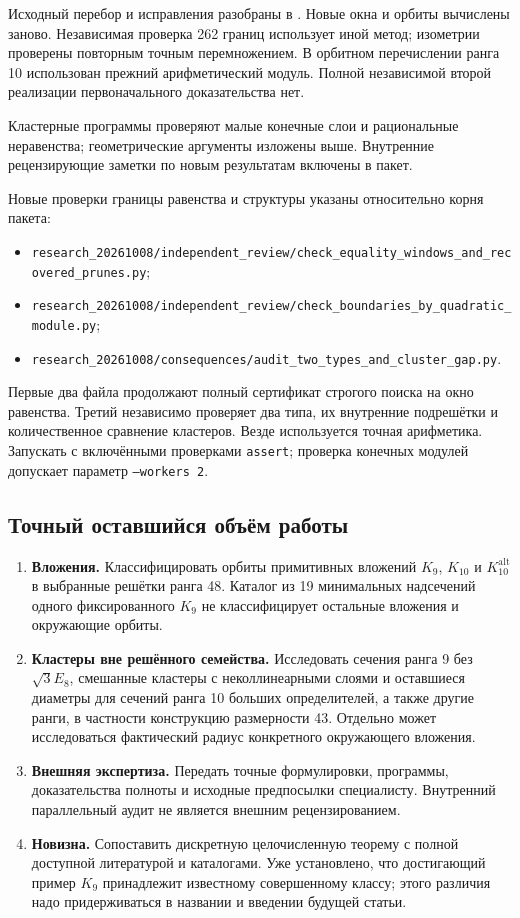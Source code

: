 \documentclass[11pt,a4paper]{article}
\theoremstyle{remark}\newtheorem{remark}[theorem]{Замечание}
\newcommand{\Kalt}{K_{10}^{\mathrm{alt}}}
\newcommand{\file}[1]{{\small\nolinkurl{#1}}}
\begin{document}
Исходный перебор и исправления разобраны в \cite{audit}. Новые окна и орбиты вычислены заново. Независимая проверка 262 границ использует иной метод; изометрии проверены повторным точным перемножением. В орбитном перечислении ранга 10 использован прежний арифметический модуль. Полной независимой второй реализации первоначального доказательства нет.

Кластерные программы проверяют малые конечные слои и рациональные неравенства; геометрические аргументы изложены выше. Внутренние рецензирующие заметки по новым результатам включены в пакет.

Новые проверки границы равенства и структуры указаны относительно корня пакета:
\begin{itemize}
\item \file{research_20261008/independent_review/check_equality_windows_and_recovered_prunes.py};
\item \file{research_20261008/independent_review/check_boundaries_by_quadratic_module.py};
\item \file{research_20261008/consequences/audit_two_types_and_cluster_gap.py}.
\end{itemize}
Первые два файла продолжают полный сертификат строгого поиска на окно равенства. Третий независимо проверяет два типа, их внутренние подрешётки и количественное сравнение кластеров. Везде используется точная арифметика. Запускать с включёнными проверками \texttt{assert}; проверка конечных модулей допускает параметр \texttt{--workers 2}.

\subsection{Точный оставшийся объём работы}

\begin{enumerate}
\item \textbf{Вложения.} Классифицировать орбиты примитивных вложений $K_9$, $K_{10}$ и $\Kalt$ в выбранные решётки ранга 48. Каталог из 19 минимальных надсечений одного фиксированного $K_9$ не классифицирует остальные вложения и окружающие орбиты.
\item \textbf{Кластеры вне решённого семейства.} Исследовать сечения ранга 9 без $\sqrt3E_8$, смешанные кластеры с неколлинеарными слоями и оставшиеся диаметры для сечений ранга 10 больших определителей, а также другие ранги, в частности конструкцию размерности 43. Отдельно может исследоваться фактический радиус конкретного окружающего вложения.
\item \textbf{Внешняя экспертиза.} Передать точные формулировки, программы, доказательства полноты и исходные предпосылки специалисту. Внутренний параллельный аудит не является внешним рецензированием.
\item \textbf{Новизна.} Сопоставить дискретную целочисленную теорему с полной доступной литературой и каталогами. Уже установлено, что достигающий пример $K_9$ принадлежит известному совершенному классу; этого различия надо придерживаться в названии и введении будущей статьи.
\end{enumerate}
\end{document}
